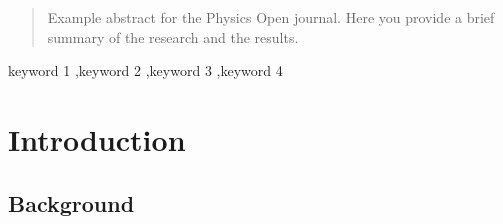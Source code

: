 \documentclass[final,5p,times,twocolumn]{elsarticle}
\begin{document}
\begin{frontmatter}
\begin{abstract}
Example abstract for the Physics Open journal. Here you provide a brief summary of the research and the results.
\end{abstract}



\begin{keyword}
keyword 1 \sep keyword 2 \sep keyword 3 \sep keyword 4



\end{keyword}


\end{frontmatter}




\section{Introduction}
\subsection{Background}
\end{document}
